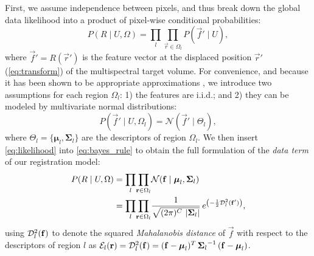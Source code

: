First, we assume independence between pixels, and thus break down the
  global data likelihood into a product of pixel-wise conditional probabilities:
  \begin{equation}
  P(R \mid U,\Omega) = \underset{l}{\prod} \underset{\vec{r}\in \Omega_l}{\prod}
    P\left( \vec{f}' \mid U \right),
  \label{eq:bayes_aposteriori}
  \end{equation}
  where $\vec{f}' = R(\vec{r}')$ is the feature vector at the displaced
  position $\vec{r}'$ (\autoref{eq:transform}) of the multispectral target
  volume.
For convenience, and because it has been shown to be appropriate approximations
  \citep{cuadra_comparison_2005}, we introduce two assumptions for each
  region $\Omega_l$:
  1) the features are i.i.d.; and 2) they can be modeled by multivariate normal
  distributions:
  \begin{equation}
  P\left( \vec{f}' \mid U,\Omega_l \right) = \mathcal{N} \left( \vec{f}' \mid \Theta_l \right),
  \label{eq:likelihood}
  \end{equation}
 	where $\Theta_l = \lbrace \boldsymbol{\mu}_l, \boldsymbol{\Sigma}_{l} \rbrace$ are the
 	descriptors of region $\Omega_l$.
We then insert \autoref{eq:likelihood} into \autoref{eq:bayes_rule} to obtain the full
  formulation of the \emph{data term} of our registration model:
 	\begin{align}
  P( R \mid U, \Omega ) &= \underset{l}{\prod} \underset{\vec{r} \in \Omega_l}{\prod}
  \mathcal{N} ( \vec{f} \mid \boldsymbol{\mu}_l, \boldsymbol{\Sigma}_{l} ) \notag\\
  &= \underset{l}{\prod} \underset{\vec{r} \in \Omega_l}{\prod} \frac{1}{ \sqrt{(2\pi)^{C}\,\left|\boldsymbol{\Sigma}_{l}\right|}}\,{e^{\left(-\frac{1}{2}
  \mdist{f'}{l} \right)}},
  \label{eq:pdf}
  \end{align}
  using $\mdist{f}{l}$ to denote the squared \emph{Mahalanobis distance} of $\vec{f}$ with respect
  to the descriptors of region $l$ as
  $\mathcal{E}_l(\vec{r}) = \mdist{f}{l} = (\vec{f} - \boldsymbol{\mu}_l)^T \, {\boldsymbol{\Sigma}_l}^{-1} \, (\vec{f} - \boldsymbol{\mu}_l)$.


